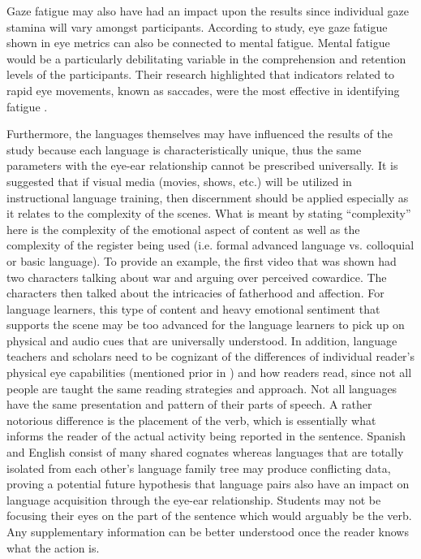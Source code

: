 Gaze fatigue may also have had an impact upon the results since
individual gaze stamina will vary amongst participants. According to
\textcite{bafna2021} study, eye gaze fatigue shown in
eye metrics can also be connected to mental fatigue. Mental fatigue
would be a particularly debilitating variable in the comprehension and
retention levels of the participants. Their research highlighted that
indicators related to rapid eye movements, known as saccades, were the
most effective in identifying fatigue \cite{bafna2021}.

Furthermore, the languages themselves may have influenced the results of
the study because each language is characteristically unique, thus the
same parameters with the eye-ear relationship cannot be prescribed
universally. It is suggested that if visual media (movies, shows, etc.)
will be utilized in instructional language training, then discernment
should be applied especially as it relates to the complexity of the
scenes. What is meant by stating ``complexity'' here is the complexity
of the emotional aspect of content as well as the complexity of the
register being used (i.e. formal advanced language vs. colloquial or
basic language). To provide an example, the first video that was shown
had two characters talking about war and arguing over perceived
cowardice. The characters then talked about the intricacies of
fatherhood and affection. For language learners, this type of content
and heavy emotional sentiment that supports the scene may be too
advanced for the language learners to pick up on physical and audio cues
that are universally understood. In addition, language teachers and
scholars need to be cognizant of the differences of individual reader's
physical eye capabilities (mentioned prior in ) and how readers
read, since not all people are taught the same reading strategies and
approach. Not all languages have the same presentation and pattern of
their parts of speech. A rather notorious difference is the placement of
the verb, which is essentially what informs the reader of the actual
activity being reported in the sentence. Spanish and English consist of
many shared cognates whereas languages that are totally isolated from
each other's language family tree may produce conflicting data, proving
a potential future hypothesis that language pairs also have an impact on
language acquisition through the eye-ear relationship. Students may not
be focusing their eyes on the part of the sentence which would arguably
be the verb. Any supplementary information can be better understood once
the reader knows what the action is.

